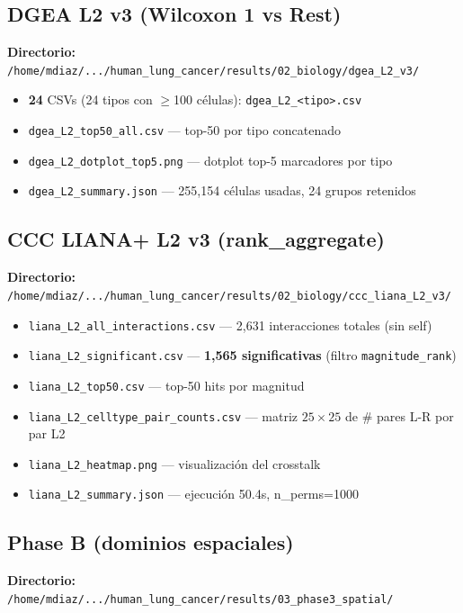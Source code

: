 \documentclass[11pt,a4paper]{article}
\begin{document}
\subsection{DGEA L2 v3 (Wilcoxon 1 vs Rest)}
\textbf{Directorio:} \texttt{\small /home/mdiaz/.../human\_lung\_cancer/results/02\_biology/dgea\_L2\_v3/}

\begin{itemize}[leftmargin=*]
\item \textbf{24} CSVs (24 tipos con $\geq$100 células): \texttt{dgea\_L2\_<tipo>.csv}
\item \texttt{dgea\_L2\_top50\_all.csv} --- top-50 por tipo concatenado
\item \texttt{dgea\_L2\_dotplot\_top5.png} --- dotplot top-5 marcadores por tipo
\item \texttt{dgea\_L2\_summary.json} --- 255{,}154 células usadas, 24 grupos retenidos
\end{itemize}

\subsection{CCC LIANA+ L2 v3 (rank\_aggregate)}
\textbf{Directorio:} \texttt{\small /home/mdiaz/.../human\_lung\_cancer/results/02\_biology/ccc\_liana\_L2\_v3/}

\begin{itemize}[leftmargin=*]
\item \texttt{liana\_L2\_all\_interactions.csv} --- 2{,}631 interacciones totales (sin self)
\item \texttt{liana\_L2\_significant.csv} --- \textbf{1{,}565 significativas} (filtro \texttt{magnitude\_rank})
\item \texttt{liana\_L2\_top50.csv} --- top-50 hits por magnitud
\item \texttt{liana\_L2\_celltype\_pair\_counts.csv} --- matriz $25 \times 25$ de \# pares L-R por par L2
\item \texttt{liana\_L2\_heatmap.png} --- visualización del crosstalk
\item \texttt{liana\_L2\_summary.json} --- ejecución 50.4s, n\_perms=1000
\end{itemize}

\subsection{Phase B (dominios espaciales)}
\textbf{Directorio:} \texttt{\small /home/mdiaz/.../human\_lung\_cancer/results/03\_phase3\_spatial/}
\end{document}
